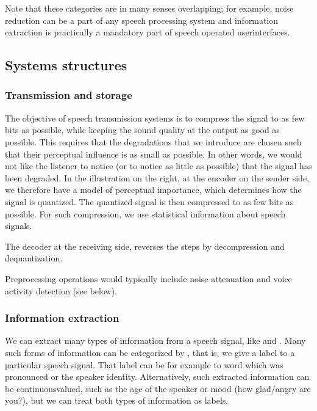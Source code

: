\documentclass[letterpaper,10pt,english]{jupyterBook}
\begin{document}
\sphinxAtStartPar
Note that these categories are in many senses overlapping; for example,
noise reduction can be a part of any speech processing system and
information extraction is practically a mandatory part of speech
operated user\sphinxhyphen{}interfaces.


\subsection{Systems structures}
\label{\detokenize{Introduction/Applications_and_systems_structures:systems-structures}}

\subsubsection{Transmission and storage}
\label{\detokenize{Introduction/Applications_and_systems_structures:transmission-and-storage}}
\sphinxAtStartPar
The objective of speech transmission systems is to compress the signal
to as few bits as possible, while keeping the sound quality at the
output as good as possible. This requires that the degradations that we
introduce are chosen such that their perceptual influence is as small as
possible. In other words, we would not like the listener to notice (or
to notice as little as possible) that the signal has been degraded. In
the illustration on the right, at the encoder on the sender side, we
therefore have a model of perceptual importance, which determines how
the signal is quantized. The quantized signal is then compressed to as
few bits as possible. For such compression, we use statistical
information about speech signals.

\sphinxAtStartPar
The decoder at the receiving side, reverses the steps by decompression
and dequantization.

\sphinxAtStartPar
Pre\sphinxhyphen{}processing operations would typically include noise attenuation and
voice activity detection (see below).

\sphinxAtStartPar
{}


\subsubsection{Information extraction}
\label{\detokenize{Introduction/Applications_and_systems_structures:information-extraction}}
\sphinxAtStartPar
We can extract many types of information from a speech signal, like
 and . Many such forms of
information can be categorized by , that is, we give a label to
a particular speech signal. That label can be for example to word which
was pronounced or the speaker identity. Alternatively, such extracted
information can be continuous\sphinxhyphen{}valued, such as the age of the speaker or
mood (how glad/angry are you?), but we can treat both types of
information as labels.
\end{document}
